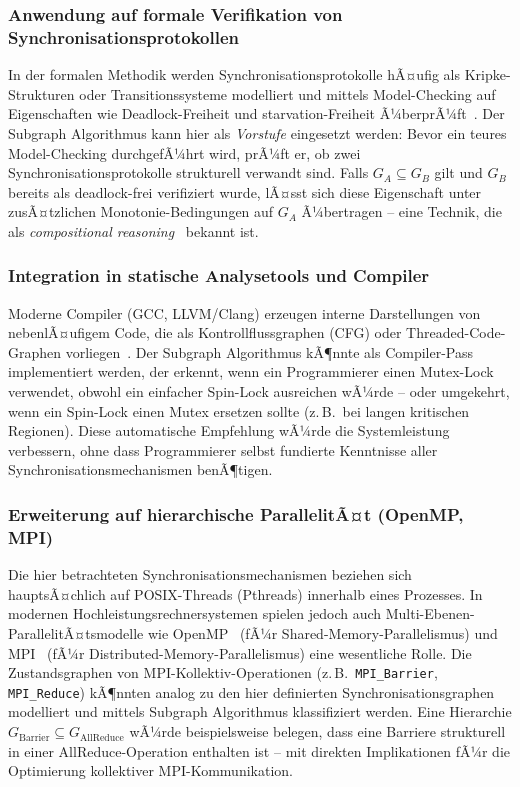 ﻿\documentclass[a4paper,12pt]{article}
\theoremstyle{definition}
\begin{document}
\subsubsection{Anwendung auf formale Verifikation von Synchronisationsprotokollen}

In der formalen Methodik werden Synchronisationsprotokolle hÃ¤ufig als
Kripke-Strukturen oder Transitionssysteme modelliert und mittels
Model-Checking auf Eigenschaften wie Deadlock-Freiheit und
starvation-Freiheit Ã¼berprÃ¼ft~\cite{clarke1999model}.
Der Subgraph Algorithmus kann hier als \emph{Vorstufe} eingesetzt werden:
Bevor ein teures Model-Checking durchgefÃ¼hrt wird, prÃ¼ft er, ob zwei
Synchronisationsprotokolle strukturell verwandt sind. Falls
$G_A \subseteq G_B$ gilt und $G_B$ bereits als deadlock-frei verifiziert
wurde, lÃ¤sst sich diese Eigenschaft unter zusÃ¤tzlichen Monotonie-Bedingungen
auf $G_A$ Ã¼bertragen -- eine Technik, die als
\emph{compositional reasoning}~\cite{mcmillan1993symbolic} bekannt ist.

\subsubsection{Integration in statische Analysetools und Compiler}

Moderne Compiler (GCC, LLVM/Clang) erzeugen interne Darstellungen von
nebenlÃ¤ufigem Code, die als Kontrollflussgraphen (CFG) oder
Threaded-Code-Graphen vorliegen~\cite{lattner2004llvm}. Der Subgraph
Algorithmus kÃ¶nnte als Compiler-Pass implementiert werden, der erkennt,
wenn ein Programmierer einen Mutex-Lock verwendet, obwohl ein einfacher
Spin-Lock ausreichen wÃ¼rde -- oder umgekehrt, wenn ein Spin-Lock
einen Mutex ersetzen sollte (z.\,B.\ bei langen kritischen Regionen).
Diese automatische Empfehlung wÃ¼rde die Systemleistung verbessern, ohne
dass Programmierer selbst fundierte Kenntnisse aller Synchronisations\-mechanismen
benÃ¶tigen.

\subsubsection{Erweiterung auf hierarchische ParallelitÃ¤t (OpenMP, MPI)}

Die hier betrachteten Synchronisationsmechanismen beziehen sich
hauptsÃ¤chlich auf POSIX-Threads (Pthreads) innerhalb eines Prozesses.
In modernen Hochleistungsrechnersystemen spielen jedoch auch
Multi-Ebenen-ParallelitÃ¤tsmodelle wie OpenMP~\cite{openmp2011} (fÃ¼r
Shared-Memory-Parallelismus) und MPI~\cite{mpi2009} (fÃ¼r
Distributed-Memory-Parallelismus) eine wesentliche Rolle. Die
Zustandsgraphen von MPI-Kollektiv-Operationen (z.\,B.\
\texttt{MPI\_Barrier}, \texttt{MPI\_Reduce}) kÃ¶nnten analog zu den
hier definierten Synchronisationsgraphen modelliert und mittels
Subgraph Algorithmus klassifiziert werden. Eine Hierarchie
$G_{\mathrm{Barrier}} \subseteq G_{\mathrm{AllReduce}}$ wÃ¼rde
beispielsweise belegen, dass eine Barriere strukturell in einer
AllReduce-Operation enthalten ist -- mit direkten Implikationen fÃ¼r
die Optimierung kollektiver MPI-Kommunikation.
\end{document}
